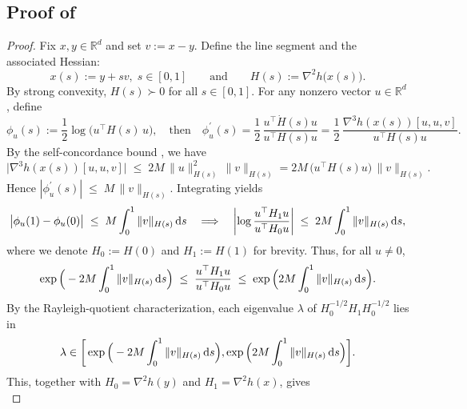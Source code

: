 \documentclass{article}
\theoremstyle{plain}
\theoremstyle{definition}
\theoremstyle{remark}
\begin{document}
\subsection{Proof of \texorpdfstring{}{Proposition }}\label{appendix:HRUC self-concordant}
\begin{proof}
Fix $x,y\in\mathbb{R}^d$ and set $v := x-y$. Define the line segment and the associated Hessian:
\begin{equation*}
    x(s) := y + s v,\; s\in[0,1]\qquad \text{and} \qquad  H(s) := \nabla^2 h\big(x(s)\big).
\end{equation*}
By strong convexity, $H(s)\succ 0$ for all $s\in[0,1]$. For any nonzero vector $u\in\mathbb{R}^d$, define
\[
    \phi_u(s) := \frac{1}{2}\log\big(u^\top H(s)\, u\big),\quad \text{then}\quad  \phi_u^\prime(s)
    = \frac{1}{2}\,\frac{u^\top \dot H(s) u}{u^\top H(s)u}
    = \frac{1}{2}\,\frac{\nabla^3 h(x(s))[u,u,v]}{u^\top H(s)u}.
\]
By the self-concordance bound \cite[Lemma 5.1.2]{Nesterov2018}, we have
\[
    \big|\nabla^3 h(x(s))[u,u,v]\big|
    \;\le\; 2M\,\|u\|_{H(s)}^2\,\|v\|_{H(s)}
    = 2M\,\big(u^\top H(s)u\big)\,\|v\|_{H(s)}.
\]
Hence $|\phi_u^\prime(s) |\;\le\; M\,\|v\|_{H(s)}.$ 
Integrating yields %
\[
    \big|\phi_u(1) - \phi_u(0)\big|
    \;\leq\;
    M \int_0^1 \|v\|_{H(s)}\,{\rm d}s \quad \Longrightarrow \quad \left|
        \log\frac{u^\top H_1 u}{u^\top H_0 u}
    \right|
    \;\leq\;
    2M \int_0^1 \|v\|_{H(s)}\,{\rm d}s,
\]
where we denote $H_0:=H(0)$ and $H_1:=H(1)$ for brevity.
Thus, for all $u\neq 0$,
\[
    \exp\Big(-2M \int_0^1 \|v\|_{H(s)}\,{\rm d}s\Big)
    \;\leq\;
    \frac{u^\top H_1 u}{u^\top H_0 u}
    \;\leq\;
    \exp\Big(2M \int_0^1 \|v\|_{H(s)}\,{\rm d}s\Big).
\]
By the Rayleigh-quotient characterization, each eigenvalue $\lambda$ of $H_0^{-1/2}H_1H_0^{-1/2}$ lies in
\[
    \lambda\in\bigg[\exp\Big(-2M \int_0^1 \|v\|_{H(s)}\,{\rm d}s\Big),\exp\Big(2M \int_0^1 \|v\|_{H(s)}\,{\rm d}s\Big)\bigg].
\]
This, together with $H_0 = \nabla^2 h(y)$ and $H_1= \nabla^2 h(x)$, gives 
\begin{equation}\label{eq:verify self 1}

\end{equation}
\end{proof}
\end{document}
